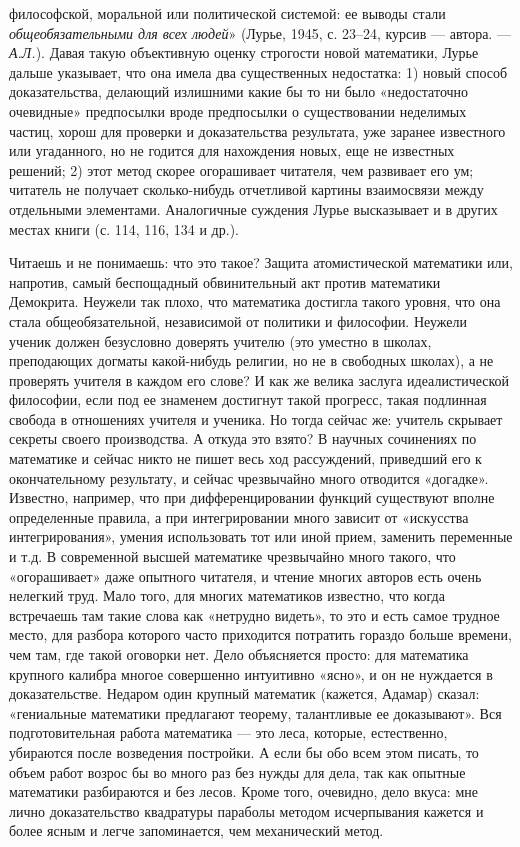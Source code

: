 философской,  моральной или  политической  системой:  ее выводы  стали
\emph{общеобязательными  для всех  людей}»  (Лурье,  1945, с.  23--24,
курсив ---  автора. ---  \emph{А.Л.}). Давая такую  объективную оценку
строгости новой математики, Лурье дальше  указывает, что она имела два
существенных  недостатка:  1)  новый способ  доказательства,  делающий
излишними  какие бы  то ни  было «недостаточно  очевидные» предпосылки
вроде предпосылки о существовании неделимых частиц, хорош для проверки
и доказательства результата, уже заранее известного или угаданного, но
не годится  для нахождения  новых, еще не  известных решений;  2) этот
метод  скорее огорашивает  читателя,  чем развивает  его ум;  читатель
не  получает  сколько-нибудь   отчетливой  картины  взаимосвязи  между
отдельными  элементами. Аналогичные  суждения  Лурье  высказывает и  в
других местах книги (с. 114, 116, 134 и др.).

Читаешь  и   не  понимаешь:  что  это   такое?  Защита  атомистической
математики или,  напротив, самый беспощадный обвинительный  акт против
математики  Демокрита.  Неужели  так плохо,  что  математика  достигла
такого уровня, что она стала общеобязательной, независимой от политики
и философии.  Неужели ученик  должен безусловно доверять  учителю (это
уместно в  школах, преподающих догматы  какой-нибудь религии, но  не в
свободных школах),  а не проверять учителя  в каждом его слове?  И как
же  велика заслуга  идеалистической  философии, если  под ее  знаменем
достигнут такой прогресс, такая подлинная свобода в отношениях учителя
и  ученика.  Но  тогда  сейчас же:  учитель  скрывает  секреты  своего
производства. А откуда  это взято? В научных  сочинениях по математике
и  сейчас  никто  не  пишет  весь ход  рассуждений,  приведший  его  к
окончательному  результату,  и   сейчас  чрезвычайно  много  отводится
«догадке».  Известно,  например,  что  при  дифференцировании  функций
существуют  вполне определенные  правила, а  при интегрировании  много
зависит  от «искусства  интегрирования», умения  использовать тот  или
иной прием, заменить переменные и т.д. В современной высшей математике
чрезвычайно много такого, что  «огорашивает» даже опытного читателя, и
чтение  многих  авторов  есть  очень нелегкий  труд.  Мало  того,  для
многих  математиков известно,  что  когда встречаешь  там такие  слова
как  «нетрудно  видеть»,  то  это  и есть  самое  трудное  место,  для
разбора которого  часто приходится  потратить гораздо  больше времени,
чем  там,  где  такой  оговорки  нет.  Дело  объясняется  просто:  для
математика  крупного калибра  многое совершенно  интуитивно «ясно»,  и
он  не  нуждается в  доказательстве.  Недаром  один крупный  математик
(кажется, Адамар)  сказал: «гениальные математики  предлагают теорему,
талантливые ее доказывают». Вся подготовительная работа математика ---
это леса, которые, естественно,  убираются после возведения постройки.
А если бы обо всем этом писать,  то объем работ возрос бы во много раз
без  нужды для  дела, так  как  опытные математики  разбираются и  без
лесов.  Кроме того,  очевидно,  дело вкуса:  мне лично  доказательство
квадратуры параболы методом исчерпывания кажется и более ясным и легче
запоминается, чем механический метод.

